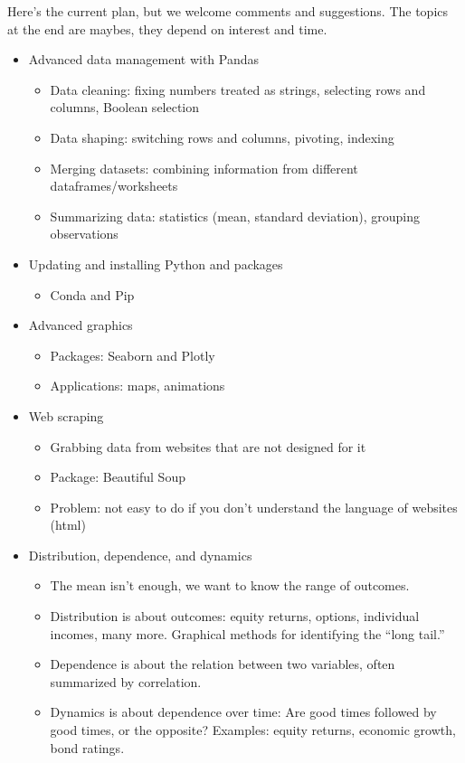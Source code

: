 \documentclass[11pt]{article}
\begin{document}
Here's the current plan, but we welcome comments and suggestions.
The topics at the end are maybes, they depend on interest and time.
\begin{itemize}
\item Advanced data management with Pandas
\begin{itemize}
\item Data cleaning:  fixing numbers treated as strings,
selecting rows and columns, Boolean selection
\item Data shaping:  switching rows and columns, pivoting, indexing
\item Merging datasets:  combining information from different dataframes/worksheets
\item Summarizing data:  statistics (mean, standard deviation), grouping observations
\end{itemize}


\item Updating and installing Python and packages
\begin{itemize}
\item Conda and Pip
\end{itemize}


\item Advanced graphics
\begin{itemize}
\item Packages:  Seaborn and Plotly
\item Applications:  maps, animations
\end{itemize}


\item Web scraping
\begin{itemize}
\item Grabbing data from websites that are not designed for it
\item Package:  Beautiful Soup
\item Problem:  not easy to do if you don't understand the language of websites (html)
\end{itemize}

\item Distribution, dependence, and dynamics
\begin{itemize}
\item The mean isn't enough, we want to know the range of outcomes.
\item Distribution is about outcomes:  equity returns, options, individual incomes, many more.
Graphical methods for identifying the ``long tail.''
\item Dependence is about the relation between two variables, often summarized by correlation.
\item Dynamics is about dependence over time:  Are good times followed by good times, or the opposite?
Examples:  equity returns, economic growth, bond ratings.
\end{itemize}


\end{itemize}
\end{document}
